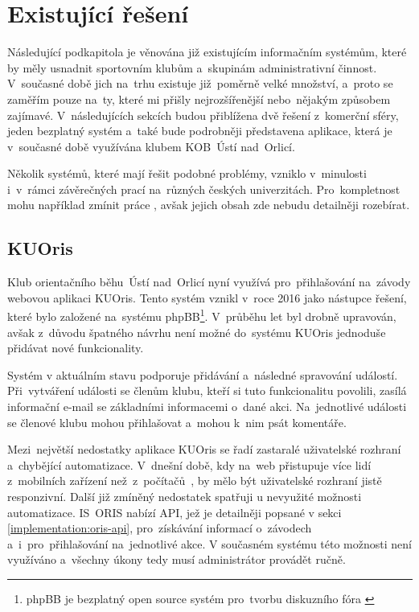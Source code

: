 \section{Existující řešení}
Následující podkapitola je věnována již existujícím informačním systémům, které by měly usnadnit sportovním klubům a~skupinám administrativní činnost. V~současné době jich na~trhu existuje již~poměrně velké množství, a~proto se zaměřím pouze na~ty, které mi přišly nejrozšířenější nebo~nějakým způsobem zajímavé. V~následujících sekcích budou přiblížena dvě řešení z~komerční sféry, jeden bezplatný systém a~také bude podrobněji představena aplikace, která je v~současné době využívána klubem KOB~Ústí nad~Orlicí.

Několik systémů, které mají řešit podobné problémy, vzniklo v~minulosti i~v~rámci závěrečných prací na~různých českých univerzitách. Pro~kompletnost mohu například zmínit práce \cite{fimuni2021, fitcvut2016, fisvse2013}, avšak jejich obsah zde nebudu detailněji rozebírat.

\subsection{KUOris}
\label{section:kuoris}
Klub orientačního běhu~Ústí nad~Orlicí nyní využívá pro~přihlašování na~závody webovou aplikaci KUOris. Tento systém vznikl v~roce 2016 jako nástupce řešení, které bylo založené na~systému phpBB\footnote{phpBB je bezplatný open source systém pro~tvorbu diskuzního fóra \cite{phpbb}}. V~průběhu let byl drobně upravován, avšak z~důvodu špatného návrhu není možné do~systému KUOris jednoduše přidávat nové funkcionality.

Systém v aktuálním stavu podporuje přidávání a~následné spravování událostí. Při~vytváření události se členům klubu, kteří si tuto funkcionalitu povolili, zasílá informační e-mail se základními informacemi o~dané akci. Na~jednotlivé události se členové klubu mohou přihlašovat a~mohou k~nim psát komentáře.

Mezi~největší nedostatky aplikace KUOris se řadí zastaralé uživatelské rozhraní a~chybějící automatizace. V~dnešní době, kdy na~web přistupuje více lidí z~mobilních zařízení než~z~počítačů~\cite{deviceusage}, by mělo být uživatelské rozhraní jistě responzivní. Další již zmíněný nedostatek spatřuji u nevyužité možnosti automatizace. IS~ORIS nabízí API, jež je detailněji popsané v sekci \ref{implementation:oris-api}, pro~získávání informací o~závodech a~i~pro~přihlašování na~jednotlivé akce. V současném systému této možnosti není využíváno a~všechny úkony tedy musí administrátor provádět ručně.

